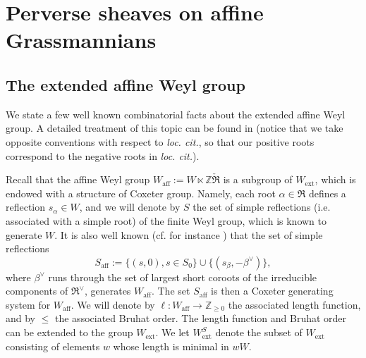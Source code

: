 \documentclass[11pt]{amsart}
\theoremstyle{plain}
\theoremstyle{remark}
\numberwithin{equation}{section}
\begin{document}
	\section{Perverse sheaves on affine Grassmannians}\label{section Perverse sheaves on affine Grassmannians}
	\subsection{The extended affine Weyl group} We state a few well known combinatorial facts about the extended affine Weyl group. A detailed treatment of this topic can be found in \cite[§2]{achar2021geometric} (notice that we take opposite conventions with respect to \textit{loc. cit.}, so that our positive roots correspond to the negative roots in \textit{loc. cit.}). 
	
	Recall that the affine Weyl group $W_{\mathrm{aff}}:=W\ltimes\mathbb{Z}\check{\mathfrak{R}}$ is a subgroup of $W_\mathrm{ext}$, which is endowed with a structure of Coxeter group. Namely, each root $\alpha\in \mathfrak{R}$ defines a reflection $s_\alpha\in W$, and we will denote by $S$ the set of simple reflections (i.e. associated with a simple root) of the finite Weyl group, which is known to generate $W$. It is also well known (cf. for instance \cite[II.6.3]{jantzen2003representations}) that the set of simple reflections 
	$$S_{\mathrm{aff}}:=\{(s,0),s\in S_0\}\cup\{(s_\beta,-\beta^\vee)\},$$ where $\beta^\vee$ runs through the set of largest short coroots of the irreducible components of $\mathfrak{R}^\vee$, generates $W_{\mathrm{aff}}$. The set $S_{\mathrm{aff}}$ is then a Coxeter generating system for $W_{\mathrm{aff}}$. We will denote by $\ell:W_{\mathrm{aff}}\to\mathbb{Z}_{\geq0}$ the associated length function, and by $\leq$ the associated Bruhat order. The length function and Bruhat order can be extended to the group $W_{\mathrm{ext}}$. We let $W^S_\mathrm{ext}$ denote the subset of $W_\mathrm{ext}$ consisting of elements $w$ whose length is minimal in $wW$.
	
\end{document}
